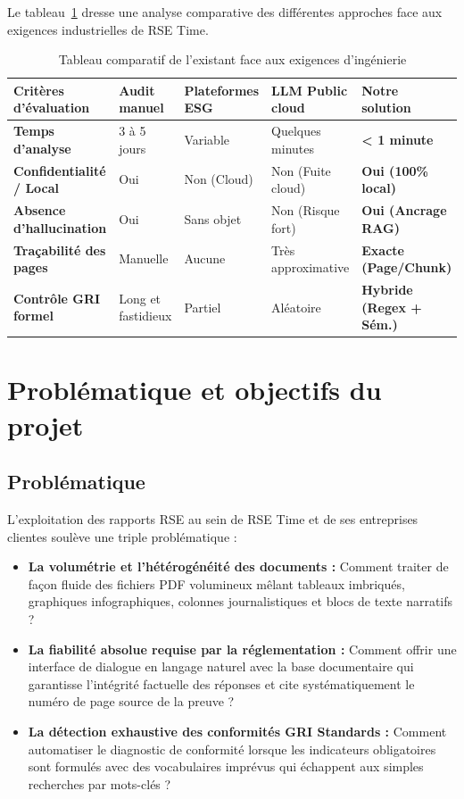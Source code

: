 \documentclass[12pt,a4paper]{report}
\begin{document}
Le tableau~\ref{tab:comparaison_existant} dresse une analyse comparative des différentes approches face aux exigences industrielles de RSE Time.

\begin{table}[H]
    \centering
    \begin{tabular}{|p{3.8cm}|p{2.6cm}|p{2.6cm}|p{3.2cm}|p{2.8cm}|}
        \hline
        \textbf{Critères d'évaluation} & \textbf{Audit manuel} & \textbf{Plateformes ESG} & \textbf{LLM Public cloud} & \textbf{Notre solution} \\
        \hline
        \textbf{Temps d'analyse} & 3 à 5 jours & Variable & Quelques minutes & \textbf{< 1 minute} \\
        \hline
        \textbf{Confidentialité / Local} & Oui & Non (Cloud) & Non (Fuite cloud) & \textbf{Oui (100\% local)} \\
        \hline
        \textbf{Absence d'hallucination} & Oui & Sans objet & Non (Risque fort) & \textbf{Oui (Ancrage RAG)} \\
        \hline
        \textbf{Traçabilité des pages} & Manuelle & Aucune & Très approximative & \textbf{Exacte (Page/Chunk)} \\
        \hline
        \textbf{Contrôle GRI formel} & Long et fastidieux & Partiel & Aléatoire & \textbf{Hybride (Regex + Sém.)} \\
        \hline
    \end{tabular}
    \caption{Tableau comparatif de l'existant face aux exigences d'ingénierie}
    \label{tab:comparaison_existant}
\end{table}

\section{Problématique et objectifs du projet}

\subsection{Problématique}
L'exploitation des rapports RSE au sein de RSE Time et de ses entreprises clientes soulève une triple problématique :
\begin{itemize}
    \item \textbf{La volumétrie et l'hétérogénéité des documents :} Comment traiter de façon fluide des fichiers PDF volumineux mêlant tableaux imbriqués, graphiques infographiques, colonnes journalistiques et blocs de texte narratifs ?
    \item \textbf{La fiabilité absolue requise par la réglementation :} Comment offrir une interface de dialogue en langage naturel avec la base documentaire qui garantisse l'intégrité factuelle des réponses et cite systématiquement le numéro de page source de la preuve ?
    \item \textbf{La détection exhaustive des conformités GRI Standards :} Comment automatiser le diagnostic de conformité lorsque les indicateurs obligatoires sont formulés avec des vocabulaires imprévus qui échappent aux simples recherches par mots-clés ?
\end{itemize}
\end{document}
